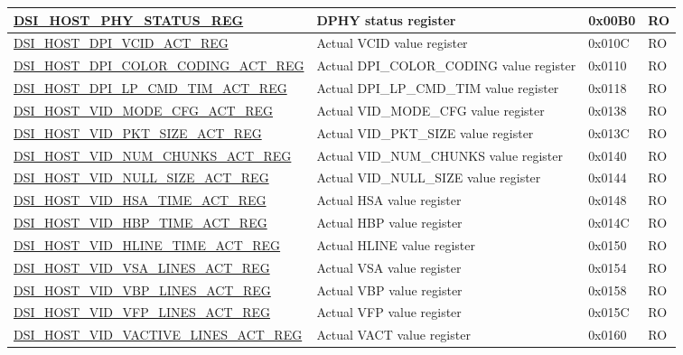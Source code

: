 \begin{longtable}{ | p{6.8cm} | p{6.5cm} | p{1.2cm} | p{1cm} | }
\hyperref[regdesc:DSIHOSTPHYSTATUSREG]{DSI\_HOST\_PHY\_STATUS\_REG} & DPHY status register & 0x00B0 & RO \\ \hline
\hyperref[regdesc:DSIHOSTDPIVCIDACTREG]{DSI\_HOST\_DPI\_VCID\_ACT\_REG} & Actual VCID value register & 0x010C & RO \\ \hline
\hyperref[regdesc:DSIHOSTDPICOLORCODINGACTREG]{DSI\_HOST\_DPI\_COLOR\_CODING\_ACT\_REG} & Actual DPI\_COLOR\_CODING value register & 0x0110 & RO \\ \hline
\hyperref[regdesc:DSIHOSTDPILPCMDTIMACTREG]{DSI\_HOST\_DPI\_LP\_CMD\_TIM\_ACT\_REG} & Actual DPI\_LP\_CMD\_TIM value register & 0x0118 & RO \\ \hline
\hyperref[regdesc:DSIHOSTVIDMODECFGACTREG]{DSI\_HOST\_VID\_MODE\_CFG\_ACT\_REG} & Actual VID\_MODE\_CFG value register & 0x0138 & RO \\ \hline
\hyperref[regdesc:DSIHOSTVIDPKTSIZEACTREG]{DSI\_HOST\_VID\_PKT\_SIZE\_ACT\_REG} & Actual VID\_PKT\_SIZE value register & 0x013C & RO \\ \hline
\hyperref[regdesc:DSIHOSTVIDNUMCHUNKSACTREG]{DSI\_HOST\_VID\_NUM\_CHUNKS\_ACT\_REG} & Actual VID\_NUM\_CHUNKS value register & 0x0140 & RO \\ \hline
\hyperref[regdesc:DSIHOSTVIDNULLSIZEACTREG]{DSI\_HOST\_VID\_NULL\_SIZE\_ACT\_REG} & Actual VID\_NULL\_SIZE value register & 0x0144 & RO \\ \hline
\hyperref[regdesc:DSIHOSTVIDHSATIMEACTREG]{DSI\_HOST\_VID\_HSA\_TIME\_ACT\_REG} & Actual HSA value register & 0x0148 & RO \\ \hline
\hyperref[regdesc:DSIHOSTVIDHBPTIMEACTREG]{DSI\_HOST\_VID\_HBP\_TIME\_ACT\_REG} & Actual HBP value register & 0x014C & RO \\ \hline
\hyperref[regdesc:DSIHOSTVIDHLINETIMEACTREG]{DSI\_HOST\_VID\_HLINE\_TIME\_ACT\_REG} & Actual HLINE value register & 0x0150 & RO \\ \hline
\hyperref[regdesc:DSIHOSTVIDVSALINESACTREG]{DSI\_HOST\_VID\_VSA\_LINES\_ACT\_REG} & Actual VSA value register & 0x0154 & RO \\ \hline
\hyperref[regdesc:DSIHOSTVIDVBPLINESACTREG]{DSI\_HOST\_VID\_VBP\_LINES\_ACT\_REG} & Actual VBP value register & 0x0158 & RO \\ \hline
\hyperref[regdesc:DSIHOSTVIDVFPLINESACTREG]{DSI\_HOST\_VID\_VFP\_LINES\_ACT\_REG} & Actual VFP value register & 0x015C & RO \\ \hline
\hyperref[regdesc:DSIHOSTVIDVACTIVELINESACTREG]{DSI\_HOST\_VID\_VACTIVE\_LINES\_ACT\_REG} & Actual VACT value register & 0x0160 & RO \\ \hline

\end{longtable}
